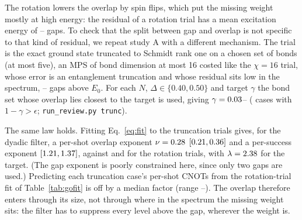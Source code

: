 The rotation lowers the overlap by spin flips, which put the missing weight mostly at high energy: the residual
of a rotation trial has a mean excitation energy of \rotResLo--\rotResHi{} gaps. To check that the split between gap
and overlap is not specific to that kind of residual, we repeat study A with a different mechanism. The trial is the
exact ground state truncated to Schmidt rank one on a chosen set of bonds (at most five), an MPS of bond dimension at
most 16 costed like the $\chi=16$ trial, whose error is an entanglement truncation and whose residual sits low in the
spectrum, \trResLo--\trResHi{} gaps above $E_0$. For each $N$, $\Delta\in\{0.40,0.50\}$ and target $\gamma$ the bond
set whose overlap lies closest to the target is used, giving $\gamma=0.03$--\trGamHi{} (\trNcases{} cases with
$1-\gamma>\epsilon$; \texttt{run\_review.py trunc}).

The same law holds. Fitting Eq.~\eqref{eq:fit} to the truncation trials gives, for the dyadic filter, a per-shot
overlap exponent $\nu=0.28$ $[0.21,0.36]$ and a per-success exponent \trDSuccgam{}
$[1.21,1.37]$, against \ciDShotgam{} and \ciDSuccgam{} for the rotation trials, with
$\lambda=2.38$ for the target. (The gap exponent is poorly constrained here, since only two gaps are used.)
Predicting each truncation case's per-shot CNOTs from the rotation-trial fit of Table~\ref{tab:gofit} is off by a
median factor \trPredMed{} (range \trPredLo--\trPredHi). The overlap therefore enters through its size, not through
where in the spectrum the missing weight sits: the filter has to suppress every level above the gap, wherever the
weight is.

